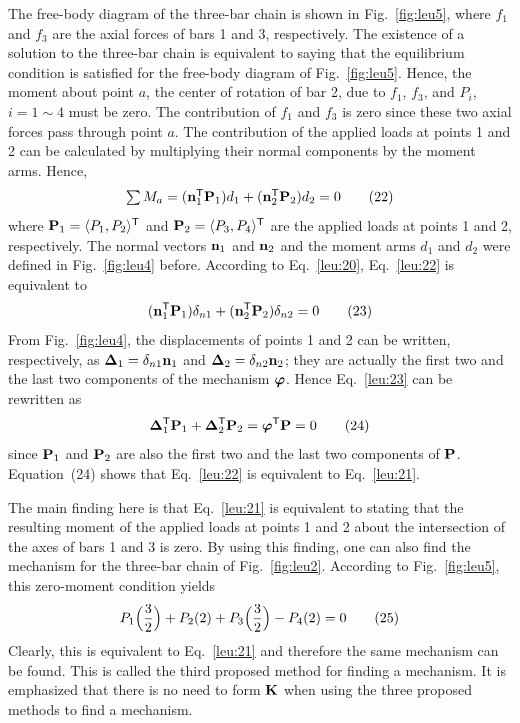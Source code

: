 The free-body diagram of the three-bar chain is shown in Fig.~\ref{fig:leu5}, where $f_1$ and $f_3$ are the axial forces of bars 1 and 3, respectively. The existence of a solution to the three-bar chain is equivalent to saying that the equilibrium condition is satisfied for the free-body diagram of Fig.~\ref{fig:leu5}. Hence, the moment about point $a$, the center of rotation of bar 2, due to $f_1$, $f_3$, and $P_i$, $i = 1\sim 4$ must be zero. The contribution of $f_1$ and $f_3$ is zero since these two axial forces pass through point $a$. The contribution of the applied loads at points 1 and 2 can be calculated by multiplying their normal components by the moment arms. Hence,
\begin{equation}
  \textstyle\sum M_a = (\mathbf{n}_1^{\mathsf{T}}\mathbf{P}_1)d_1 + (\mathbf{n}_2^{\mathsf{T}}\mathbf{P}_2)d_2 = 0 \tag{22}\label{leu:22}
\end{equation}
where $\mathbf{P}_1 = \langle P_1, P_2\rangle^{\mathsf{T}}$ and $\mathbf{P}_2 = \langle P_3, P_4\rangle^{\mathsf{T}}$ are the applied loads at points 1 and 2, respectively. The normal vectors $\mathbf{n}_1$ and $\mathbf{n}_2$ and the moment arms $d_1$ and $d_2$ were defined in Fig.~\ref{fig:leu4} before. According to Eq.~\eqref{leu:20}, Eq.~\eqref{leu:22} is equivalent to
\begin{equation}
  (\mathbf{n}_1^{\mathsf{T}}\mathbf{P}_1)\delta_{n1} + (\mathbf{n}_2^{\mathsf{T}}\mathbf{P}_2)\delta_{n2} = 0 \tag{23}\label{leu:23}
\end{equation}
From Fig.~\ref{fig:leu4}, the displacements of points 1 and 2 can be written, respectively, as $\bm{\Delta}_1 = \delta_{n1}\mathbf{n}_1$ and $\bm{\Delta}_2 = \delta_{n2}\mathbf{n}_2$; they are actually the first two and the last two components of the mechanism $\bm{\varphi}$. Hence Eq.~\eqref{leu:23} can be rewritten as
\begin{equation}
  \bm{\Delta}_1^{\mathsf{T}}\mathbf{P}_1 + \bm{\Delta}_2^{\mathsf{T}}\mathbf{P}_2 = \bm{\varphi}^{\mathsf{T}}\mathbf{P} = 0 \tag{24}
\end{equation}
since $\mathbf{P}_1$ and $\mathbf{P}_2$ are also the first two and the last two components of $\mathbf{P}$. Equation~(24) shows that Eq.~\eqref{leu:22} is equivalent to Eq.~\eqref{leu:21}.

The main finding here is that Eq.~\eqref{leu:21} is equivalent to stating that the resulting moment of the applied loads at points 1 and 2 about the intersection of the axes of bars 1 and 3 is zero. By using this finding, one can also find the mechanism for the three-bar chain of Fig.~\ref{fig:leu2}. According to Fig.~\ref{fig:leu5}, this zero-moment condition yields
\begin{equation}
  P_1\Bigl(\frac32\Bigr) + P_2(2) + P_3\Bigl(\frac32\Bigr) - P_4(2) = 0 \tag{25}\label{leu:25}
\end{equation}
Clearly, this is equivalent to Eq.~\eqref{leu:21} and therefore the same mechanism can be found. This is called the third proposed method for finding a mechanism. It is emphasized that there is no need to form $\mathbf{K}$ when using the three proposed methods to find a mechanism.

